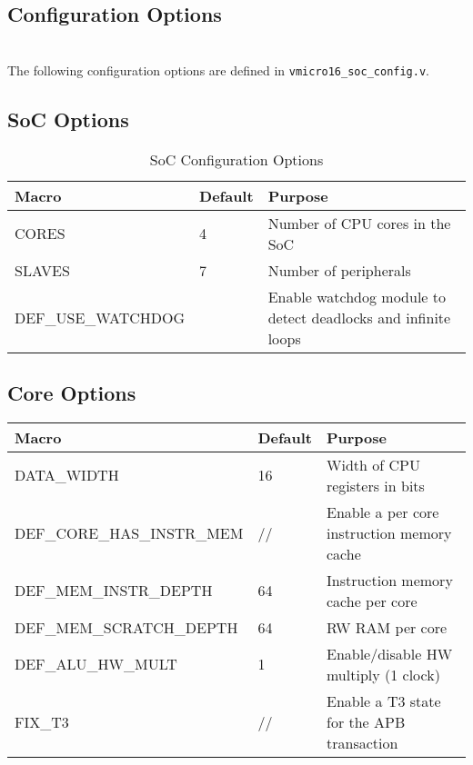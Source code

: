 \begin{appendices}
\startcontents[chapters]

\chapter{Configuration Options}
\startcontents[chapters]

\noindent\\
The following configuration options are defined in \verb|vmicro16_soc_config.v|.

\section{SoC Options}
\begin{table}[H]
\centering
\label{tab:isa}
\begin{tabularx}{\textwidth}{l|l|p{8cm}}
Macro      & Default & Purpose                         \\ 
\hline
CORES  & 4       & Number of CPU cores in the SoC  \\
SLAVES & 7       & Number of peripherals  \\    
DEF\_USE\_WATCHDOG &  & Enable watchdog module to detect deadlocks and infinite loops \\    
\end{tabularx}
\caption{SoC Configuration Options}
\end{table}

\section{Core Options}
\begin{table}[H]
\centering
\begin{tabular}{l|l|p{8cm}}
Macro                      & Default & Purpose                                     \\ 
\hline
DATA\_WIDTH                & 16      & Width of CPU registers in bits              \\
DEF\_CORE\_HAS\_INSTR\_MEM & //      & Enable a per core instruction memory cache  \\
DEF\_MEM\_INSTR\_DEPTH     & 64      & Instruction memory cache per core           \\
DEF\_MEM\_SCRATCH\_DEPTH   & 64      & RW RAM per core                             \\
DEF\_ALU\_HW\_MULT        & 1       & Enable/disable HW multiply (1 clock)        \\
FIX\_T3                    & //      & Enable a T3 state for the APB transaction \\


\end{tabular}
\end{table}
\end{appendices}
